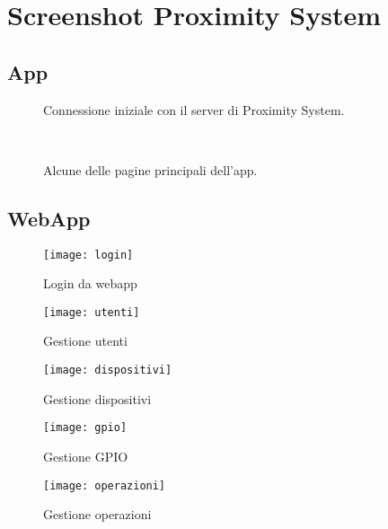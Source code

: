 \chapter{Screenshot Proximity System}
\section{App}
\begin{figure}[htpb!]
  \centering
   \quad
  \caption{Connessione iniziale con il server di Proximity System.}
  \label{fig:subfig}
\end{figure}

\begin{figure}
  \centering
   \quad
   \\
   \quad
  \caption{Alcune delle pagine principali dell'app.}
  \label{fig:subfig}
\end{figure}

\section{WebApp}

\begin{figure}[htpb!]
  \centering
  \texttt{[image: login]}
  \caption{Login da webapp}
  \label{fig:login}
\end{figure}

\begin{figure}[htpb!]
  \centering
  \texttt{[image: utenti]}
  \caption{Gestione utenti}
  \label{fig:utenti}
\end{figure}

\begin{figure}[htpb!]
  \centering
  \texttt{[image: dispositivi]}
  \caption{Gestione dispositivi}
  \label{fig:dispositivi}
\end{figure}

\begin{figure}[htpb!]
  \centering
  \texttt{[image: gpio]}
  \caption{Gestione GPIO}
  \label{fig:gpio}
\end{figure}

\begin{figure}[htpb!]
  \centering
  \texttt{[image: operazioni]}
  \caption{Gestione operazioni}
  \label{fig:operazioni}
\end{figure}
